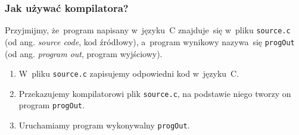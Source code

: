 \documentclass[10pt,t]{beamer}
\begin{document}
\begin{frame}
  \frametitle{Jak używać kompilatora?}


  Przyjmijmy, że~program napisany w~języku~C znajduje~się w~pliku
  \texttt{source.c} (od ang. \textit{source code}, kod źródłowy), a~program
  wynikowy nazywa~się \texttt{progOut} (od ang. \textit{program out},
  program wyjściowy).





  \begin{enumerate}

  \item W~pliku \texttt{source.c} zapisujemy odpowiedni kod w~języku~C.



  \item Przekazujemy kompilatorowi plik \texttt{source.c}, na podstawie
    niego tworzy on program \texttt{progOut}.



  \item Uruchamiamy program wykonywalny \texttt{progOut}.

  \end{enumerate}

\end{frame}
\end{document}
